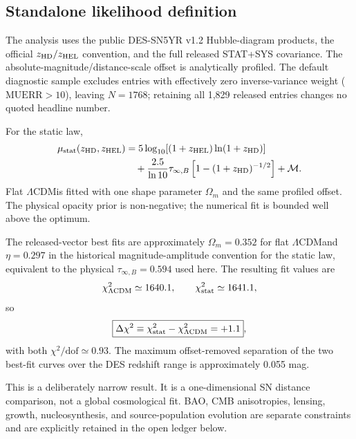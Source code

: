 \documentclass[11pt]{article}
\newcommand{\LCDM}{$\Lambda$CDM}
\newcommand{\tauinf}{\tau_{\infty,B}}
\begin{document}
\subsection{Standalone likelihood definition}
The analysis uses the public DES-SN5YR v1.2 Hubble-diagram products, the official $z_{\rm HD}/z_{\rm HEL}$ convention, and the full released STAT+SYS covariance. The absolute-magnitude/distance-scale offset is analytically profiled. The default diagnostic sample excludes entries with effectively zero inverse-variance weight ($\mathrm{MUERR}>10$), leaving $N=1768$; retaining all 1,829 released entries changes no quoted headline number.

For the static law,
\begin{align}
 \mu_{\rm stat}(z_{\rm HD},z_{\rm HEL})
 &=5\log_{10}\!\left[(1+z_{\rm HEL})\ln(1+z_{\rm HD})\right]\\
 &\quad+\frac{2.5}{\ln10}\tauinf
 \left[1-(1+z_{\rm HD})^{-1/2}\right]+\mathcal M.
 \label{eq:mustat}
\end{align}
Flat \LCDM is fitted with one shape parameter $\Omega_m$ and the same profiled offset. The physical opacity prior is non-negative; the numerical fit is bounded well above the optimum.

The released-vector best fits are approximately $\Omega_m=0.352$ for flat \LCDM and $\eta=0.297$ in the historical magnitude-amplitude convention for the static law, equivalent to the physical $\tauinf=0.594$ used here. The resulting fit values are
\begin{equation}
 \chi^2_{\Lambda{\rm CDM}}\simeq1640.1,
 \qquad
 \chi^2_{\rm stat}\simeq1641.1,
\end{equation}
so
\begin{equation}
 \boxed{\Delta\chi^2\equiv\chi^2_{\rm stat}-\chi^2_{\Lambda{\rm CDM}}=+1.1},
 \label{eq:headline}
\end{equation}
with both $\chi^2/\mathrm{dof}\simeq0.93$. The maximum offset-removed separation of the two best-fit curves over the DES redshift range is approximately 0.055 mag.

This is a deliberately narrow result. It is a one-dimensional SN distance comparison, not a global cosmological fit. BAO, CMB anisotropies, lensing, growth, nucleosynthesis, and source-population evolution are separate constraints and are explicitly retained in the open ledger below.
\end{document}
